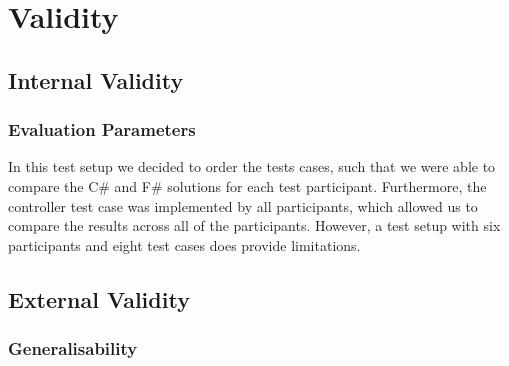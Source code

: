 \section{Validity} \label{sec:validity}

\subsection{Internal Validity}

\subsubsection{Evaluation Parameters}
In this test setup we decided to order the tests cases, such that we were able to compare the C\# and F\# solutions for each test participant. Furthermore, the controller test case was implemented by all participants, which allowed us to compare the results across all of the participants. However, a test setup with six participants and eight test cases does provide limitations. 

\subsection{External Validity}


\subsubsection{Generalisability}
